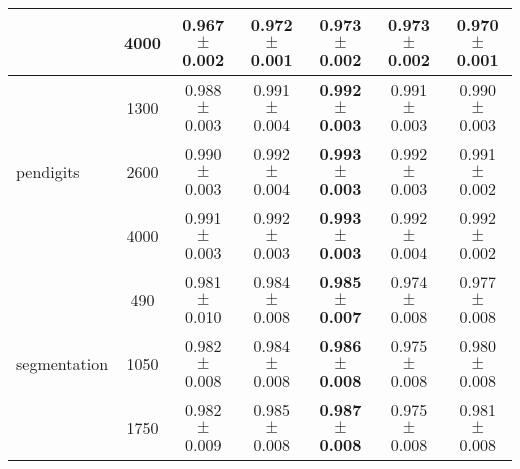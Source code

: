 \documentclass{standalone}
\begin{document}
\begin{table*}
\begin{small}
\begin{sc}
{\begin{tabular}{|l|c|c|c|c|c|c|}
	& 4000			& 0.967 $\pm$ 0.002 & 0.972 $\pm$ 0.001 			& 0.973 $\pm$ 0.002 	& \textbf{0.973 $\pm$ 0.002} & 0.970 $\pm$ 0.001\\
\hline
\multirow{3}{*}{pendigits}
	& 1300			& 0.988 $\pm$ 0.003 & 0.991 $\pm$ 0.004 & \textbf{0.992 $\pm$ 0.003} & 0.991 $\pm$ 0.003 & 0.990 $\pm$ 0.003 \\
	& 2600			& 0.990 $\pm$ 0.003 & 0.992 $\pm$ 0.004 & \textbf{0.993 $\pm$ 0.003} & 0.992 $\pm$ 0.003 & 0.991 $\pm$ 0.002 \\
	& 4000			& 0.991 $\pm$ 0.003 & 0.992 $\pm$ 0.003 & \textbf{0.993 $\pm$ 0.003} & 0.992 $\pm$ 0.004 & 0.992 $\pm$ 0.002 \\
\hline
\multirow{3}{*}{segmentation}
	& 490			& 	0.981 $\pm$ 0.010 & 0.984 $\pm$ 0.008 & \textbf{0.985 $\pm$ 0.007} & 0.974 $\pm$ 0.008 & 0.977 $\pm$ 0.008 \\
	& 1050			& 	0.982 $\pm$ 0.008 & 0.984 $\pm$ 0.008 & \textbf{0.986 $\pm$ 0.008} & 0.975 $\pm$ 0.008 & 0.980 $\pm$ 0.008 \\
	& 1750			& 	0.982 $\pm$ 0.009 & 0.985 $\pm$ 0.008 & \textbf{0.987 $\pm$ 0.008} & 0.975 $\pm$ 0.008 & 0.981 $\pm$ 0.008 \\
\hline
\end{tabular}
\vskip -0.1in
} %
\end{sc}
\end{small}
\end{table*}
	
\end{document}

